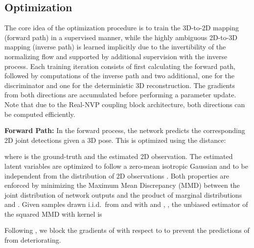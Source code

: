 \documentclass[10pt,twocolumn,letterpaper]{article}
\begin{document}
\subsection{Optimization}
\label{sec:optimization}
The core idea of the optimization procedure is to train the 3D-to-2D mapping (forward path) in a supervised manner, while the highly ambiguous 2D-to-3D mapping (inverse path) is learned implicitly due to the invertibility of the normalizing flow and supported by additional supervision with the inverse process. 
Each training iteration
consists of first calculating the forward path, followed by  computations of the inverse path and two additional, one for the discriminator and one for the deterministic 3D reconstruction. The gradients from both directions are accumulated before performing a parameter update. Note that due to the Real-NVP coupling block architecture, both directions can be computed efficiently.

\textbf{Forward Path:}
In the forward process, the network predicts the corresponding 2D joint detections given a 3D pose.
This is optimized using the  distance:

where  is the ground-truth and  the estimated 2D observation.
The estimated latent variables are optimized to follow a zero-mean isotropic Gaussian  and to be independent from the distribution of 2D observations . 
Both properties are enforced by minimizing the Maximum Mean Discrepancy (MMD) \cite{JMLR:v13:gretton12a} between the joint distribution of network outputs  and the product of marginal distributions  and .
Given samples  drawn i.i.d.\ from  and  with  and , ,
the unbiased estimator of the squared MMD with kernel  is

Following \cite{ArdizzoneINN}, we block the gradients of  with respect to  to prevent the predictions of  from deteriorating.
\end{document}
